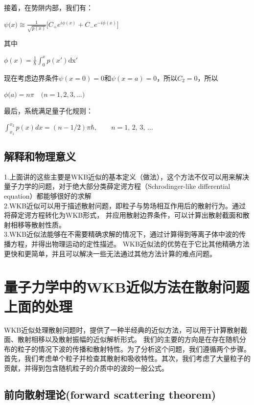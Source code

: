 \documentclass[12pt, a4paper, oneside]{ctexart}
\begin{document}
\begin{spacing}{2.0}
接着，在势阱内部，我们有：
\begin{center}
    $\displaystyle\psi\big(x\big)\cong\frac{1}{\sqrt{p(x)}}\biggl[C_+e^{i\phi(x)}+C_-e^{-i\phi(x)}\biggr]$
\end{center}
其中
\begin{center}
    $\displaystyle \phi(x) = \frac{1}{\hbar}\int_0^xp(x')\mathrm{dx'}$
\end{center}
现在考虑边界条件$\psi(x=0)=0$和$\psi(x=a)=0$，所以$C_2=0$，所以
\begin{center}
    $\phi\bigl(a\bigr)=n\pi\quad\bigl(n=1,2,3,...\bigr)$
\end{center}
最后，系统满足量子化规则：
\begin{center}
    $\displaystyle \int_{x_1}^{x_2} p(x)dx =(n - 1/2)\pi\hbar,\qquad n=1,\,2,\,3,\,\dots\,\!$
\end{center}

\subsection{解释和物理意义}
1.上面讲的这些主要是WKB近似的基本定义（做法），这个方法不仅可以用来解决量子力学的问题，对于绝大部分类薛定谔方程（Schrodinger-like differential equation）都能够很好的求解\\

2.WKB近似可以用于描述散射问题，即粒子与势场相互作用后的散射行为。通过将薛定谔方程转化为WKB形式，
并应用散射边界条件，可以计算出散射截面和散射相移等散射性质。
\\
3.WKB近似法能够在不需要精确求解的情况下，通过计算得到等离子体中波的传播方程，并得出物理运动的定性描述。
WKB近似法的优势在于它比其他精确方法更快和更简单，并且可以解决一些无法通过其他方法计算的难点问题。

\section{量子力学中的WKB近似方法在散射问题上面的处理}
WKB近似处理散射问题时，提供了一种半经典的近似方法，可以用于计算散射截面、散射相移以及散射振幅的近似解析形式。
我们的主要的方向是在存在随机分布的粒子的情况下波的传播和散射特性。为了分析这个问题，我们遵循两个步骤。\cite{5472149}
首先，我们考虑单个粒子并检查其散射和吸收特性。其次，我们考虑了大量粒子的贡献，并得到包含随机粒子的介质中的波的一般公式。

\subsection{前向散射理论(forward scattering theorem)}


\end{spacing}
\end{document}
